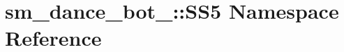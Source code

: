 \hypertarget{namespacesm__dance__bot__2_1_1SS5}{}\section{sm\+\_\+dance\+\_\+bot\+\_\+:\+:S\+S5 Namespace Reference}
\label{namespacesm__dance__bot__2_1_1SS5}
